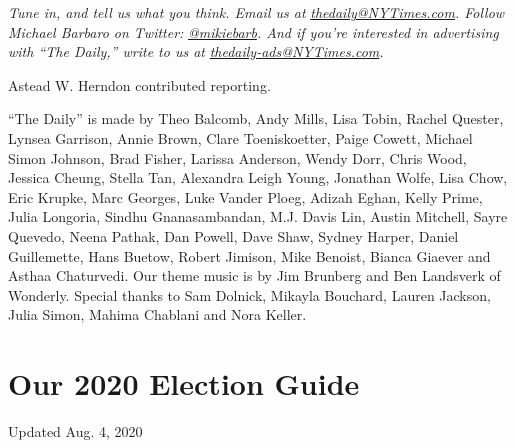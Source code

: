 \emph{Tune in, and tell us what you think. Email us at}
\href{mailto:thedaily@NYTimes.com}{\emph{thedaily@NYTimes.com}}\emph{.
Follow Michael Barbaro on Twitter:}
\href{https://twitter.com/mikiebarb}{\emph{@mikiebarb}}\emph{. And if
you're interested in advertising with ``The Daily,'' write to us at}
\href{mailto:thedaily-ads@NYTimes.com}{\emph{thedaily-ads@NYTimes.com}}\emph{.}

Astead W. Herndon contributed reporting.

``The Daily'' is made by Theo Balcomb, Andy Mills, Lisa Tobin, Rachel
Quester, Lynsea Garrison, Annie Brown, Clare Toeniskoetter, Paige
Cowett, Michael Simon Johnson, Brad Fisher, Larissa Anderson, Wendy
Dorr, Chris Wood, Jessica Cheung, Stella Tan, Alexandra Leigh Young,
Jonathan Wolfe, Lisa Chow, Eric Krupke, Marc Georges, Luke Vander Ploeg,
Adizah Eghan, Kelly Prime, Julia Longoria, Sindhu Gnanasambandan, M.J.
Davis Lin, Austin Mitchell, Sayre Quevedo, Neena Pathak, Dan Powell,
Dave Shaw, Sydney Harper, Daniel Guillemette, Hans Buetow, Robert
Jimison, Mike Benoist, Bianca Giaever and Asthaa Chaturvedi. Our theme
music is by Jim Brunberg and Ben Landsverk of Wonderly. Special thanks
to Sam Dolnick, Mikayla Bouchard, Lauren Jackson, Julia Simon, Mahima
Chablani and Nora Keller.

\hypertarget{our-2020-election-guide}{%
\section{Our 2020 Election Guide}\label{our-2020-election-guide}}

Updated Aug. 4, 2020

